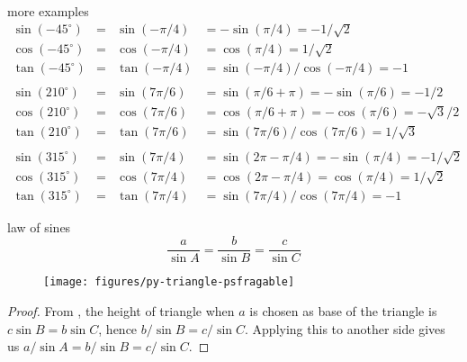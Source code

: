 \documentclass[17pt,landscape]{foils}
\begin{document}
\eit
{}
\bit
\item
more examples
\[
\begin{array}{cccl}
\sin(-45^\circ ) &=&\sin(-\pi/4) &= - \sin(\pi/4) = - 1/\sqrt{2}
\\
\cos(-45^\circ ) &=&\cos(-\pi/4) &= \cos(\pi/4) = 1/\sqrt{2}
\\
\tan(-45^\circ) &=& \tan(-\pi/4) &= \sin(-\pi/4) / \cos(-\pi/4) = -1
\\
\\
\sin(210^\circ ) &=&\sin(7\pi/6) &= \sin(\pi/6 + \pi) = -\sin(\pi/6) = - 1/{2}
\\
\cos(210^\circ ) &=&\cos(7\pi/6) &= \cos(\pi/6 + \pi) = -\cos(\pi/6) = - \sqrt{3}/{2}
\\
\tan(210^\circ) &=& \tan(7\pi/6) &= \sin(7\pi/6) / \cos(7\pi/6) = 1/\sqrt{3}
\\
\\
\sin(315^\circ ) &=&\sin(7\pi/4) &= \sin(2\pi - \pi/4) = -\sin(\pi/4) = - 1/\sqrt{2}
\\
\cos(315^\circ ) &=&\cos(7\pi/4) &= \cos(2\pi - \pi/4) = \cos(\pi/4) = 1/\sqrt{2}
\\
\tan(315^\circ) &=& \tan(7\pi/4) &= \sin(7\pi/4) / \cos(7\pi/4) = -1
\end{array}
\]
\eit
{}
\bit
\item
\bit
\item
\eit
\vitem
\bit
\item
\eit
\eit
{}
\begin{mylaw}{law of sines}
$$
\frac{a}{\sin A}
=
\frac{b}{\sin B}
=
\frac{c}{\sin C}
$$
\end{mylaw}
\vfill
\begin{figure}
\begin{center}
\texttt{[image: figures/py-triangle-psfragable]}
\label{fig:triangle}
\end{center}
\end{figure}
\vfill
\begin{proof}
From , the height of triangle when $a$ is chosen as base of the triangle is $c\sin B = b\sin C$,
hence $b/\sin B = c/\sin C$.
Applying this to another side gives us $a/\sin A = b/\sin B = c/\sin C$.
\end{proof}
\end{document}

